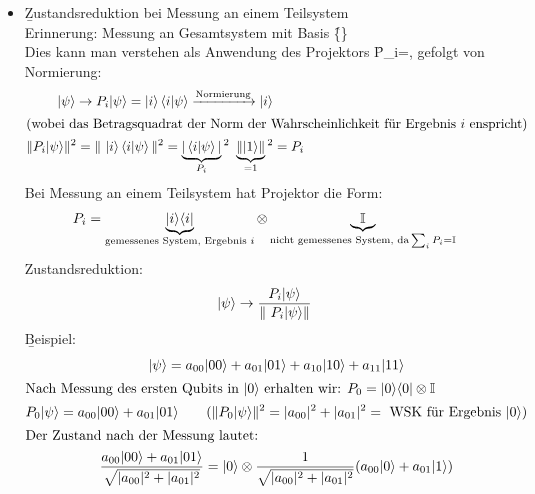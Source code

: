 \begin{itemize}
\begin{gather*}
        \cbra{i}\varrho_A\cket{i} = \sum_k\cbra{i,k}\varrho_{AB}\cket{j,k}\qquad\text{(Summe über Basis \f{\left\{\cket{k}\right\}} von System \f{B})}
    \end{gather*}
    \item \b{Zustandsreduktion bei Messung an einem Teilsystem}\\
    Erinnerung: Messung an Gesamtsystem mit Basis \f{\left\{\right\}\quad\Rightarrow\quad\cket{\psi}}\\
    Dies kann man verstehen als Anwendung des Projektors \f{P_i=}, gefolgt von Normierung:
    \begin{gather*}
        \cket{\psi}\rightarrow P_i\cket{\psi} = \cket{i}\skal{i}{\psi} \xrightarrow{\text{Normierung}}\cket{i}\\
        \shortintertext{(wobei das Betragsquadrat der Norm der Wahrscheinlichkeit für Ergebnis \f{i} enspricht)}
        \Vert P_i\cket{\psi}\Vert^2 = \Vert\ \cket{i}\skal{i}{\psi}\Vert^2 = \underbrace{|\skal{i}{\psi}|}_{P_i}{^2}\ \underbrace{\Vert\cket{1}\Vert}_{=1}{^2}=P_i
    \end{gather*}
    Bei Messung an einem Teilsystem hat Projektor die Form: 
    \begin{gather*}
        P_i = \underbrace{|i\rangle\langle i|}_{\text{gemessenes System, Ergebnis ${i}$}}\otimes\underbrace{\mathbb{I}}_{\text{nicht gemessenes System, da} \sum_iP_i = \mathbb{I}}
    \end{gather*}
    Zustandsreduktion: 
    \begin{gather*}
        \cket{\psi}\rightarrow\frac{P_i\cket{\psi}}{\Vert\ P_i\cket{\psi}\Vert}
    \end{gather*}
    \b{Beispiel:}
    \begin{gather*}
        |\psi\rangle = a_{00}|00\rangle+ a_{01}|01\rangle+ a_{10}|10\rangle+a_{11}|11\rangle\\
        \shortintertext{Nach Messung des ersten Qubits in $|0\rangle$ erhalten wir: 
        $P_0 = |0\rangle\langle0|\otimes\mathbb{I}$}
        P_0|\psi\rangle = a_{00}|00\rangle+a_{01}|01\rangle 
        \qquad(\Vert P_0|\psi\rangle\Vert^2 = |a_{00}|^2+|a_{01}|^2 = \text{ WSK für Ergebnis }|0\rangle)\\
        \shortintertext{Der Zustand nach der Messung lautet:}
        \frac{a_{00}|00\rangle+a_{01}|01\rangle}{\sqrt{|a_{00}|^2+|a_{01}|^2}}
        = |0\rangle\otimes\frac{1}{\sqrt{|a_{00}|^2+|a_{01}|^2}}
        (a_{00}|0\rangle+a_{01}|1\rangle)
    \end{gather*}

\end{itemize}
